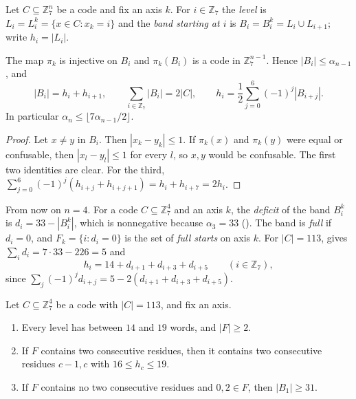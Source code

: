\documentclass[11pt,colorlinks]{charlie}
\newcommand{\Zs}{\mathbb{Z}_7}
\begin{document}
Let $C\subseteq\Zs^n$ be a code and fix an axis $k$. For $i\in\Zs$ the \emph{level} is $L_i=L^k_i=\{x\in C:x_k=i\}$ and the \emph{band starting at $i$} is $B_i=B^k_i=L_i\cup L_{i+1}$; write $h_i=|L_i|$.

\begin{lemma}\label{lem:bands}
The map $\pi_k$ is injective on $B_i$ and $\pi_k(B_i)$ is a code in $\Zs^{n-1}$. Hence $|B_i|\le\alpha_{n-1}$, and
\[
 |B_i|=h_i+h_{i+1},\qquad\sum_{i\in\Zs}|B_i|=2|C|,\qquad h_i=\frac12\sum_{j=0}^{6}(-1)^j|B_{i+j}|.
\]
In particular $\alpha_n\le\lfloor7\alpha_{n-1}/2\rfloor$.
\end{lemma}

\begin{proof}
Let $x\ne y$ in $B_i$. Then $|x_k-y_k|\le1$. If $\pi_k(x)$ and $\pi_k(y)$ were equal or confusable, then $|x_l-y_l|\le1$ for every $l$, so $x,y$ would be confusable. The first two identities are clear. For the third, $\sum_{j=0}^6(-1)^j(h_{i+j}+h_{i+j+1})=h_i+h_{i+7}=2h_i$.
\end{proof}

From now on $n=4$. For a code $C\subseteq\Zs^4$ and an axis $k$, the \emph{deficit} of the band $B^k_i$ is $d_i=33-|B^k_i|$, which is nonnegative because $\alpha_3=33$ (). The band is \emph{full} if $d_i=0$, and $F_k=\{i:d_i=0\}$ is the set of \emph{full starts} on axis $k$. For $|C|=113$,  gives $\sum_id_i=7\cdot33-226=5$ and
\begin{equation}\label{eq:levels}
 h_i=14+d_{i+1}+d_{i+3}+d_{i+5}\qquad(i\in\Zs),
\end{equation}
since $\sum_j(-1)^jd_{i+j}=5-2(d_{i+1}+d_{i+3}+d_{i+5})$.

\begin{lemma}\label{lem:deficits}
Let $C\subseteq\Zs^4$ be a code with $|C|=113$, and fix an axis.
\begin{enumerate}
\item Every level has between $14$ and $19$ words, and $|F|\ge2$.
\item If $F$ contains two consecutive residues, then it contains two consecutive residues $c-1,c$ with $16\le h_c\le19$.
\item If $F$ contains no two consecutive residues and $0,2\in F$, then $|B_1|\ge31$.
\end{enumerate}
\end{lemma}
\end{document}
